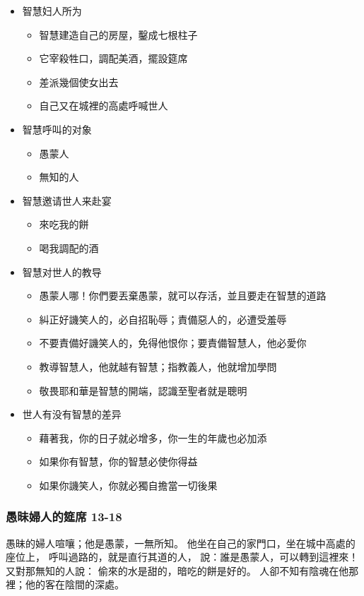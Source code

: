\begin{itemize}
\itemsep-.45em  
\item 智慧妇人所为
\begin{itemize}
\itemsep-.45em  
\item 智慧建造自己的房屋，鑿成七根柱子
\item 它宰殺牲口，調配美酒，擺設筵席
\item 差派幾個使女出去
\item 自己又在城裡的高處呼喊世人
\end{itemize}
\item 智慧呼叫的对象
\begin{itemize}
\itemsep-.45em  
\item 愚蒙人
\item 無知的人
\end{itemize}
\item 智慧邀请世人来赴宴
\begin{itemize}
\itemsep-.45em  
\item 來吃我的餅
\item 喝我調配的酒
\end{itemize}
\item 智慧对世人的教导
\begin{itemize}
\itemsep-.45em  
\item 愚蒙人哪！你們要丟棄愚蒙，就可以存活，並且要走在智慧的道路
\item 糾正好譏笑人的，必自招恥辱；責備惡人的，必遭受羞辱
\item 不要責備好譏笑人的，免得他恨你；要責備智慧人，他必愛你
\item 教導智慧人，他就越有智慧；指教義人，他就增加學問
\item 敬畏耶和華是智慧的開端，認識至聖者就是聰明
\end{itemize}
\item 世人有没有智慧的差异
\begin{itemize}
\itemsep-.45em  
\item 藉著我，你的日子就必增多，你一生的年歲也必加添
\item 如果你有智慧，你的智慧必使你得益
\item 如果你譏笑人，你就必獨自擔當一切後果
\end{itemize}
\end{itemize}
\subsubsection{愚昧婦人的筵席 13-18}
愚昧的婦人喧嚷；他是愚蒙，一無所知。
他坐在自己的家門口，坐在城中高處的座位上，
呼叫過路的，就是直行其道的人，
說：誰是愚蒙人，可以轉到這裡來！又對那無知的人說：
偷來的水是甜的，暗吃的餅是好的。
人卻不知有陰魂在他那裡；他的客在陰間的深處。


